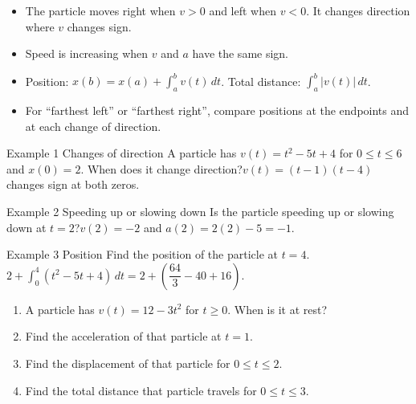 \documentclass[11pt]{article}
\begin{document}

\begin{ideabox}
\begin{itemize}[leftmargin=*,itemsep=2pt,topsep=2pt]
  \item The particle moves right when $v>0$ and left when $v<0$. It changes direction where $v$ changes sign.
  \item Speed is increasing when $v$ and $a$ have the same sign.
  \item Position: $x(b)=x(a)+\displaystyle\int_{a}^{b}v(t)\,dt$. Total distance: $\displaystyle\int_{a}^{b}|v(t)|\,dt$.
  \item For \textquotedblleft{}farthest left\textquotedblright{} or \textquotedblleft{}farthest right\textquotedblright{}, compare positions at the endpoints and at each change of direction.
\end{itemize}
\end{ideabox}

\begin{example}{Example 1 \textperiodcentered{} Changes of direction}
A particle has $v(t)=t^2-5t+4$ for $0\le t\le6$ and $x(0)=2$. When does it change direction?\soln $v(t)=(t-1)(t-4)$ changes sign at both zeros.
\end{example}

\begin{example}{Example 2 \textperiodcentered{} Speeding up or slowing down}
Is the particle speeding up or slowing down at $t=2$?\soln $v(2)=-2$ and $a(2)=2(2)-5=-1$.
\end{example}

\begin{example}{Example 3 \textperiodcentered{} Position}
Find the position of the particle at $t=4$.\soln $2+\displaystyle\int_{0}^{4}(t^2-5t+4)\,dt=2+\left(\dfrac{64}{3}-40+16\right)$.
\end{example}

\newpage
{}

\begin{enumerate}[leftmargin=*,itemsep=2pt]
  \item A particle has $v(t)=12-3t^2$ for $t\ge0$. When is it at rest?\work{2.3cm}
  \item Find the acceleration of that particle at $t=1$.\work{2.3cm}
  \item Find the displacement of that particle for $0\le t\le2$.\work{2.3cm}
  \item Find the total distance that particle travels for $0\le t\le3$.\work{2.3cm}
\end{enumerate}
\end{document}
